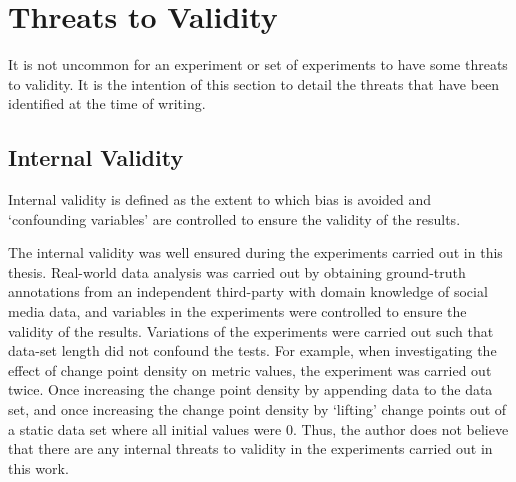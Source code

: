 \documentclass[../main.tex]{subfiles}
\begin{document}

\section{Threats to Validity}
\label{threats}

It is not uncommon for an experiment or set of experiments to have some threats to validity. It is the intention of this section to detail the threats that have been identified at the time of writing.

\subsection{Internal Validity}

Internal validity is defined as the extent to which bias is avoided and `confounding variables' are controlled to ensure the validity of the results.

The internal validity was well ensured during the experiments carried out in this thesis. Real-world data analysis was carried out by obtaining ground-truth annotations from an independent third-party with domain knowledge of social media data, and variables in the experiments were controlled to ensure the validity of the results. Variations of the experiments were carried out such that data-set length did not confound the tests. For example, when investigating the effect of change point density on metric values, the experiment was carried out twice. Once increasing the change point density by appending data to the data set, and once increasing the change point density by `lifting' change points out of a static data set where all initial values were $0$. Thus, the author does not believe that there are any internal threats to validity in the experiments carried out in this work.
\end{document}
